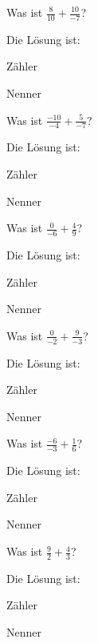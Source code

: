 \documentclass{ximera}
\begin{document}
\begin{shuffle}
\begin{question}
Was ist $\frac{8}{10} + \frac{10}{-7}$?
\begin{solution}
Die Lösung ist:

Zähler 

Nenner 
\end{solution}
\end{question}


\begin{question}
Was ist $\frac{-10}{-4} + \frac{5}{-7}$?
\begin{solution}
Die Lösung ist:

Zähler 

Nenner 
\end{solution}
\end{question}


\begin{question}
Was ist $\frac{0}{-6} + \frac{4}{9}$?
\begin{solution}
Die Lösung ist:

Zähler 

Nenner 
\end{solution}
\end{question}


\begin{question}
Was ist $\frac{0}{-2} + \frac{9}{-3}$?
\begin{solution}
Die Lösung ist:

Zähler 

Nenner 
\end{solution}
\end{question}


\begin{question}
Was ist $\frac{-6}{-3} + \frac{1}{6}$?
\begin{solution}
Die Lösung ist:

Zähler 

Nenner 
\end{solution}
\end{question}


\begin{question}
Was ist $\frac{9}{2} + \frac{4}{3}$?
\begin{solution}
Die Lösung ist:

Zähler 

Nenner 
\end{solution}
\end{question}



\end{shuffle}
\end{document}
